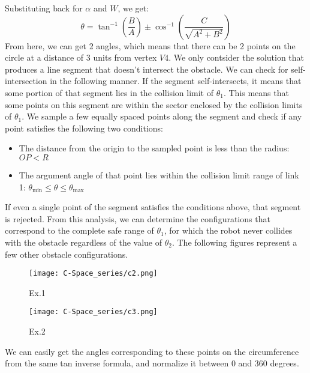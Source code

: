 \documentclass[12pt]{article}
\begin{document}
Substituting back for $\alpha$ and $W$, we get:
\[
\theta = \tan^{-1}\left(\frac{B}{A}\right) \pm \cos^{-1}\left(\frac{C}{\sqrt{A^2 + B^2}}\right)
\]
\newline
\newline
From here, we can get 2 angles, which means that there can be 2 points on the circle at a distance of 3 units from vertex $V4$. We only contsider the solution that produces a line segment that doesn't intersect the obstacle.
\newline
We can check for self-intersection in the following manner. If the segment self-intersects, it means that some portion of that segment lies in the collision limit of $\theta_1$. This means that some points on this segment are within the sector enclosed by the collision limits of $\theta_1$.
\newline
We sample a few equally spaced points along the segment and check if any point satisfies the following two conditions:
\begin{itemize}
    \item The distance from the origin to the sampled point is less than the radius: \( OP < R \)
    \item The argument angle of that point lies within the collision limit range of link 1: \( \theta_{\text{min}} \leq \theta \leq \theta_{\text{max}} \)
\end{itemize}
If even a single point of the segment satisfies the conditions above, that segment is rejected.
\newline
\newline
From this analysis, we can determine the configurations that correspond to the complete safe range of \(\theta_1\), for which the robot never collides with the obstacle regardless of the value of \(\theta_2\). The following figures represent a few other obstacle configurations.
\begin{figure}[h!]
    \centering
    \begin{minipage}{0.49\textwidth}
        \centering
        \texttt{[image: C-Space\_series/c2.png]}
        \caption{Ex.1}
        \label{fig:c2}
    \end{minipage}
    \hfill
    \begin{minipage}{0.49\textwidth}
        \centering
        \texttt{[image: C-Space\_series/c3.png]}
        \caption{Ex.2}
        \label{fig:c3}
    \end{minipage}
\end{figure}
\newline
We can easily get the angles corresponding to these points on the circumference from the same tan inverse formula, and normalize it between 0 and 360 degrees.
\clearpage
\end{document}
